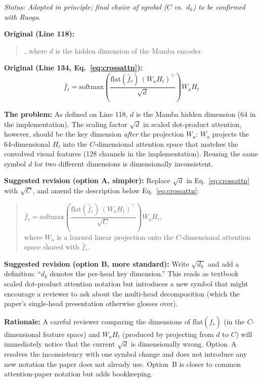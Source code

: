 \documentclass{article}
\begin{document}
\textit{Status: Adopted in principle; final choice of symbol ($C$ vs.\ $d_k$) to be confirmed with Ruogu.}

\textbf{Original (Line 118):}
\begin{quote}
\ldots where $d$ is the hidden dimension of the Mamba encoder.
\end{quote}

\textbf{Original (Line 134, Eq.~\ref{eq:crossattn}):}
\begin{equation*}
\bar{f}_r = \mathrm{softmax}\!\left(\frac{\mathrm{flat}(\hat{f}_r)\,(W_a H_t)^\top}{\sqrt{d}}\right) W_a H_t
\end{equation*}

\textbf{The problem:}
As defined on Line 118, $d$ is the Mamba hidden dimension (64 in the implementation). The scaling factor $\sqrt{d}$ in scaled dot-product attention, however, should be the key dimension \emph{after} the projection $W_a$: $W_a$ projects the 64-dimensional $H_t$ into the $C$-dimensional attention space that matches the convolved visual features (128 channels in the implementation). Reusing the same symbol $d$ for two different dimensions is dimensionally inconsistent.

\textbf{Suggested revision (option A, simpler):}
Replace $\sqrt{d}$ in Eq.~\ref{eq:crossattn} with $\sqrt{C}$, and amend the description below Eq.~\ref{eq:crossattn}:
\begin{quote}
$\bar{f}_r = \mathrm{softmax}\!\left(\dfrac{\mathrm{flat}(\hat{f}_r)\,(W_a H_t)^\top}{\sqrt{C}}\right) W_a H_t$,\\[2pt]
where $W_a$ is a learned linear projection onto the $C$-dimensional attention space shared with $\hat{f}_r$.
\end{quote}

\textbf{Suggested revision (option B, more standard):}
Write $\sqrt{d_k}$ and add a definition: ``$d_k$ denotes the per-head key dimension.'' This reads as textbook scaled dot-product attention notation but introduces a new symbol that might encourage a reviewer to ask about the multi-head decomposition (which the paper's single-head presentation otherwise glosses over).

\textbf{Rationale:}
A careful reviewer comparing the dimensions of $\mathrm{flat}(\hat{f}_r)$ (in the $C$-dimensional feature space) and $W_a H_t$ (produced by projecting from $d$ to $C$) will immediately notice that the current $\sqrt{d}$ is dimensionally wrong. Option~A resolves the inconsistency with one symbol change and does not introduce any new notation the paper does not already use. Option~B is closer to common attention-paper notation but adds bookkeeping.
\end{document}
